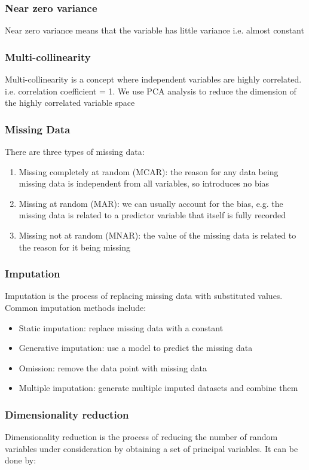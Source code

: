 \documentclass[12pt,a4paper]{article}
\begin{document}
\subsubsection{Near zero variance}
Near zero variance means that the variable has little variance i.e. almost constant
\subsubsection{Multi-collinearity}
Multi-collinearity is a concept where independent variables are highly correlated. i.e. correlation coefficient = 1.
We use PCA analysis to reduce the dimension of the highly correlated variable space 
\subsubsection{Missing Data}
There are three types of missing data:
\begin{enumerate}
    \item Missing completely at random (MCAR): the reason for any data being missing data is independent from all variables, so introduces no bias
    \item Missing at random (MAR): we can usually account for the bias, e.g. the missing data is related to a predictor variable that itself is fully recorded
    \item Missing not at random (MNAR): the value of the missing data is related to the reason for it being missing
\end{enumerate}
\subsubsection{Imputation}
Imputation is the process of replacing missing data with substituted values. Common imputation methods include:
\begin{itemize}
    \item Static imputation: replace missing data with a constant
    \item Generative imputation: use a model to predict the missing data
    \item Omission: remove the data point with missing data
    \item Multiple imputation: generate multiple imputed datasets and combine them
\end{itemize}

\subsubsection{Dimensionality reduction}
Dimensionality reduction is the process of reducing the number of random variables under consideration by obtaining a set of principal variables. It can be done by:
\end{document}
